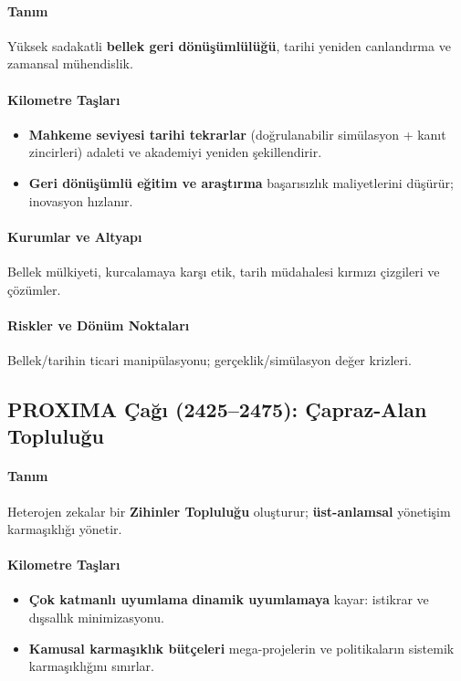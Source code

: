 \documentclass[11pt]{article}
\begin{document}
\begin{itemize}[noitemsep]
\begin{itemize}[noitemsep]
\begin{itemize}[noitemsep]
\begin{itemize}[noitemsep]
\begin{itemize}[noitemsep]
\begin{itemize}[noitemsep]
\begin{itemize}[noitemsep]
\begin{enumerate}[noitemsep]
\begin{itemize}[noitemsep]
\paragraph{Tanım} Yüksek sadakatli \textbf{bellek geri dönüşümlülüğü}, tarihi yeniden canlandırma ve zamansal mühendislik.

\paragraph{Kilometre Taşları}
\begin{itemize}[noitemsep]
  \item \textbf{Mahkeme seviyesi tarihi tekrarlar} (doğrulanabilir simülasyon + kanıt zincirleri) adaleti ve akademiyi yeniden şekillendirir.
  \item \textbf{Geri dönüşümlü eğitim ve araştırma} başarısızlık maliyetlerini düşürür; inovasyon hızlanır.
\end{itemize}

\paragraph{Kurumlar ve Altyapı} Bellek mülkiyeti, kurcalamaya karşı etik, tarih müdahalesi kırmızı çizgileri ve çözümler.

\paragraph{Riskler ve Dönüm Noktaları} Bellek/tarihin ticari manipülasyonu; gerçeklik/simülasyon değer krizleri.

\subsection{PROXIMA Çağı (2425–2475): Çapraz-Alan Topluluğu}
\paragraph{Tanım} Heterojen zekalar bir \textbf{Zihinler Topluluğu} oluşturur; \textbf{üst-anlamsal} yönetişim karmaşıklığı yönetir.

\paragraph{Kilometre Taşları}
\begin{itemize}[noitemsep]
  \item \textbf{Çok katmanlı uyumlama} \textbf{dinamik uyumlamaya} kayar: istikrar ve dışsallık minimizasyonu.
  \item \textbf{Kamusal karmaşıklık bütçeleri} mega-projelerin ve politikaların sistemik karmaşıklığını sınırlar.
\end{itemize}


\end{itemize}
\end{enumerate}
\end{itemize}
\end{itemize}
\end{itemize}
\end{itemize}
\end{itemize}
\end{itemize}
\end{itemize}
\end{document}
